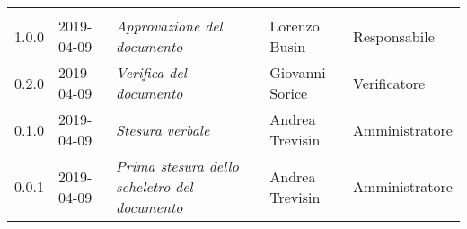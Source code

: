 \newpage 
\section*{}
	\begin{longtable}{C{2cm}|C{2.5cm}|C{4.5cm}|C{2.5cm}|C{3cm}}
	
	 &  &  &  &   \\
	\endhead
		
		1.0.0 & 2019-04-09 &  \emph{Approvazione del documento} & Lorenzo Busin & Responsabile\\
		\hline
		
		0.2.0 & 2019-04-09 & \emph{Verifica del documento} & Giovanni Sorice & Verificatore \\
		\hline
		
		0.1.0 & 2019-04-09 & \emph{Stesura verbale} & Andrea Trevisin & Amministratore \\
		\hline
		
		0.0.1 & 2019-04-09 & \emph{Prima stesura dello scheletro del documento} & Andrea Trevisin & Amministratore \\
		
\end{longtable}



\clearpage